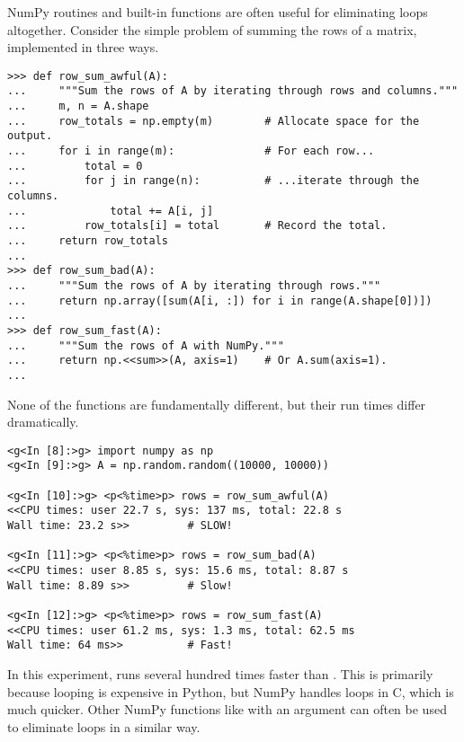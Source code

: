 NumPy routines and built-in functions are often useful for eliminating loops altogether. %
Consider the simple problem of summing the rows of a matrix, implemented in three ways.

\begin{lstlisting}
>>> def row_sum_awful(A):
...     """Sum the rows of A by iterating through rows and columns."""
...     m, n = A.shape
...     row_totals = np.empty(m)        # Allocate space for the output.
...     for i in range(m):              # For each row...
...         total = 0
...         for j in range(n):          # ...iterate through the columns.
...             total += A[i, j]
...         row_totals[i] = total       # Record the total.
...     return row_totals
...
>>> def row_sum_bad(A):
...     """Sum the rows of A by iterating through rows."""
...     return np.array([sum(A[i, :]) for i in range(A.shape[0])])
...
>>> def row_sum_fast(A):
...     """Sum the rows of A with NumPy."""
...     return np.<<sum>>(A, axis=1)    # Or A.sum(axis=1).
...
\end{lstlisting}

None of the functions are fundamentally different, but their run times differ dramatically.

\begin{lstlisting}
<g<In [8]:>g> import numpy as np
<g<In [9]:>g> A = np.random.random((10000, 10000))

<g<In [10]:>g> <p<%time>p> rows = row_sum_awful(A)
<<CPU times: user 22.7 s, sys: 137 ms, total: 22.8 s
Wall time: 23.2 s>>         # SLOW!

<g<In [11]:>g> <p<%time>p> rows = row_sum_bad(A)
<<CPU times: user 8.85 s, sys: 15.6 ms, total: 8.87 s
Wall time: 8.89 s>>         # Slow!

<g<In [12]:>g> <p<%time>p> rows = row_sum_fast(A)
<<CPU times: user 61.2 ms, sys: 1.3 ms, total: 62.5 ms
Wall time: 64 ms>>          # Fast!
\end{lstlisting}

In this experiment,  runs several hundred times faster than .
This is primarily because looping is expensive in Python, but NumPy handles loops in C, which is much quicker.
Other NumPy functions like  with an  argument can often be used to eliminate loops in a similar way.

